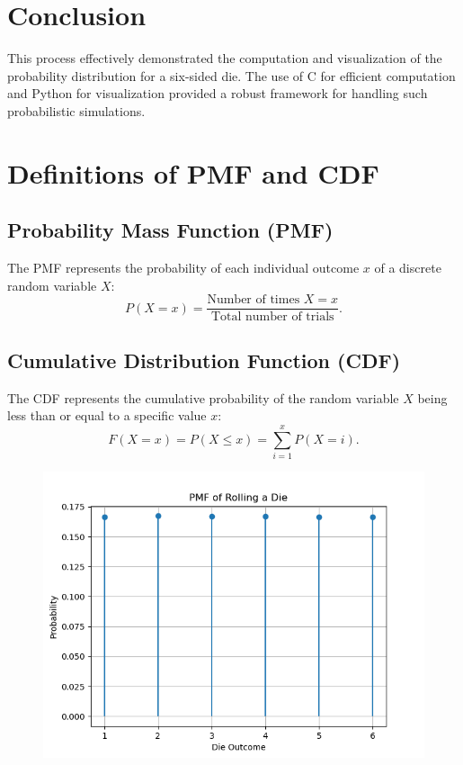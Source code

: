 \documentclass[journal]{IEEEtran}
\begin{document}
\section*{Conclusion}
This process effectively demonstrated the computation and visualization of the probability distribution for a six-sided die. The use of C for efficient computation and Python for visualization provided a robust framework for handling such probabilistic simulations.
\section*{Definitions of PMF and CDF}
\subsection*{Probability Mass Function (PMF)}
The PMF represents the probability of each individual outcome \(x\) of a discrete random variable \(X\):
\[
P(X = x) = \frac{\text{Number of times } X = x}{\text{Total number of trials}}.
\]

\subsection*{Cumulative Distribution Function (CDF)}
The CDF represents the cumulative probability of the random variable \(X\) being less than or equal to a specific value \(x\):
\[
F(X = x) = P(X \leq x) = \sum_{i=1}^x P(X = i).
\]
\begin{figure}[h!]
   \centering
   \includegraphics[width=\columnwidth]{figs/Figure_1.png}
\end{figure}
\end{document}
